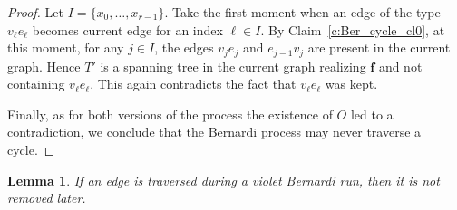 \documentclass[10pt]{amsart}
\newtheorem{lemma}[theo]{Lemma}
\theoremstyle{definition}\newtheorem{defi}[theo]{Definition}
\theoremstyle{remark}\newtheorem{rema}[theo]{Remark}
\begin{document}
\begin{proof}
Let $I=\{x_0,\dots,x_{r-1}\}$. Take the first moment when an edge of the type $v_\ell e_\ell$ becomes current edge for an index $\ell\in I$. By Claim~\ref{c:Ber_cycle_cl0}, at this moment, for any $j\in I$, the edges $v_j e_j$ and $e_{j-1} v_{j}$ are present in the current graph. Hence $T'$ is a spanning tree in the current graph realizing $\mathbf f$ and not containing $v_\ell e_\ell$. This again contradicts the fact that $v_\ell e_\ell$ was kept.

Finally, as for both versions of the process the existence of $O$ led to a contradiction, we conclude that the Bernardi process may never traverse a cycle.
\end{proof}

\begin{lemma}\label{l:traversed_edge_is_not_deleted}
If an edge is traversed during a violet Bernardi run, then it is not removed later.
\end{lemma}
\end{document}

